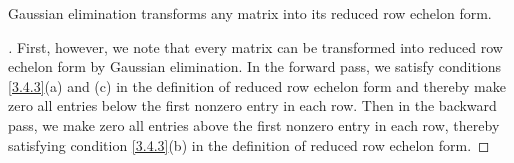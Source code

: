 \begin{thm}\label{3.14}
  Gaussian elimination transforms any matrix into its reduced row echelon form.
\end{thm}

\begin{proof}[]
  First, however, we note that every matrix can be transformed into reduced row echelon form by Gaussian elimination.
  In the forward pass, we satisfy conditions \cref{3.4.3}(a) and (c) in the definition of reduced row echelon form and thereby make zero all entries below the first nonzero entry in each row.
  Then in the backward pass, we make zero all entries above the first nonzero entry in each row, thereby satisfying condition \cref{3.4.3}(b) in the definition of reduced row echelon form.
\end{proof}

\begin{thm}\label{3.15}

\end{thm}

\begin{thm}\label{3.16}

\end{thm}

\begin{cor}\label{3.4.5}

\end{cor}
